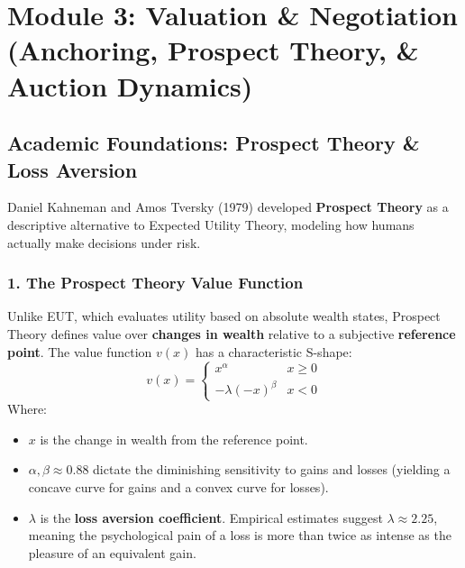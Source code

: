 \documentclass[11pt,a4paper]{article}
\begin{document}
\newpage
\section{Module 3: Valuation \& Negotiation (Anchoring, Prospect Theory, \& Auction Dynamics)}

\subsection{Academic Foundations: Prospect Theory \& Loss Aversion}
Daniel Kahneman and Amos Tversky (1979) developed \textbf{Prospect Theory} as a descriptive alternative to Expected Utility Theory, modeling how humans actually make decisions under risk.

\subsubsection{1. The Prospect Theory Value Function}
Unlike EUT, which evaluates utility based on absolute wealth states, Prospect Theory defines value over \textbf{changes in wealth} relative to a subjective \textbf{reference point}. The value function $v(x)$ has a characteristic S-shape:
\begin{equation}
    v(x) = 
    \begin{cases} 
      x^\alpha & x \ge 0 \\
      -\lambda (-x)^\beta & x < 0
    \end{cases}
\end{equation}
Where:
\begin{itemize}
    \item $x$ is the change in wealth from the reference point.
    \item $\alpha, \beta \approx 0.88$ dictate the diminishing sensitivity to gains and losses (yielding a concave curve for gains and a convex curve for losses).
    \item $\lambda$ is the \textbf{loss aversion coefficient}. Empirical estimates suggest $\lambda \approx 2.25$, meaning the psychological pain of a loss is more than twice as intense as the pleasure of an equivalent gain.
\end{itemize}
\end{document}
